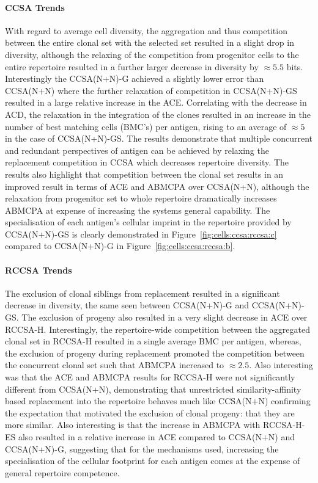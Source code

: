 \paragraph{CCSA Trends}
With regard to average cell diversity, the aggregation and thus competition between the entire clonal set with the selected set resulted in a slight drop in diversity, although the relaxing of the competition from progenitor cells to the entire repertoire resulted in a further larger decrease in diversity by $\approx 5.5$ bits.
Interestingly the CCSA(N+N)-G achieved a slightly lower error than CCSA(N+N) where the further relaxation of competition in CCSA(N+N)-GS resulted in a large relative increase in the ACE.
Correlating with the decrease in ACD, the relaxation in the integration of the clones resulted in an increase in the number of best matching cells (BMC's) per antigen, rising to an average of $\approx 5$ in the case of CCSA(N+N)-GS.
The results demonstrate that multiple concurrent and redundant perspectives of antigen can be achieved by relaxing the replacement competition in CCSA which decreases repertoire diversity. The results also highlight that competition between the clonal set results in an improved result in terms of ACE and ABMCPA over CCSA(N+N), although the relaxation from progenitor set to whole repertoire dramatically increases ABMCPA at expense of increasing the systems general capability. The specialisation of each antigen's cellular imprint in the repertoire provided by CCSA(N+N)-GS is clearly demonstrated in Figure~\ref{fig:cells:ccsa:rccsa:c} compared to CCSA(N+N)-G in Figure~\ref{fig:cells:ccsa:rccsa:b}.

%
%
\paragraph{RCCSA Trends}
The exclusion of clonal siblings from replacement resulted in a significant decrease in diversity, the same seen between CCSA(N+N)-G and CCSA(N+N)-GS. 
The exclusion of progeny also resulted in a very slight decrease in ACE over RCCSA-H.
Interestingly, the repertoire-wide competition between the aggregated clonal set in RCCSA-H resulted in a single average BMC per antigen, whereas, the exclusion of progeny during replacement promoted the competition between the concurrent clonal set such that ABMCPA increased to $\approx 2.5$.
Also interesting was that the ACE and ABMCPA results for RCCSA-H were not significantly different from CCSA(N+N), demonstrating that unrestricted similarity-affinity based replacement into the repertoire behaves much like CCSA(N+N) confirming the expectation that motivated the exclusion of clonal progeny: that they are more similar. Also interesting is that the increase in ABMCPA with RCCSA-H-ES also resulted in a relative increase in ACE compared to CCSA(N+N) and CCSA(N+N)-G, suggesting that for the mechanisms used, increasing the specialisation of the cellular footprint for each antigen comes at the expense of general repertoire competence. 

